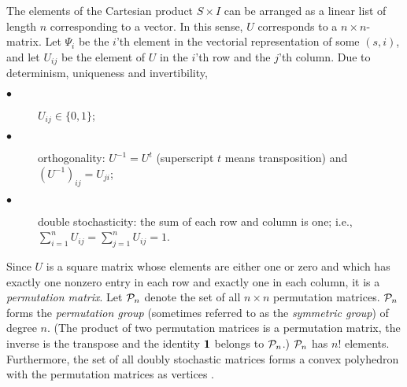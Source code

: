 \documentclass[pra,amsfonts,twocolumn]{revtex4}
\begin{document}
The elements of the Cartesian product
$S\times I$ can be arranged as a linear list of length
$n$ corresponding to  a vector. In this sense,
$U$ corresponds to a $n\times n$-matrix.  Let $\Psi_i$
be the $i$'th element in the vectorial representation of some
$(s,i)$, and let
$U_{ij}$ be the element
of
$U$ in the $i$'th row and the $j$'th column.
Due to
determinism, uniqueness and invertibility,
\begin{description}
\item[$\bullet$]
$U_{ij}\in \{0,1\}$;
\item[$\bullet$]
orthogonality:
 $U^{-1}=U^t$ (superscript $t$ means transposition) and
$(U^{-1})_{ij}=U_{ji}$;
\item[$\bullet$]
double stochasticity:
the sum of each row and column is one; i.e.,
$\sum_{i=1}^n U_{ij}= \sum_{j=1}^n U_{ij}=1$.
\end{description}
Since $U$ is a square matrix whose elements are either one or zero and
which has exactly one nonzero entry in each row and exactly one in each
column, it is a {\em permutation matrix}.
Let ${\cal P}_n$ denote the set of all $n\times n$ permutation matrices.
 ${\cal P}_n$ forms the {\em permutation group} (sometimes referred to
as the
{\em symmetric group}) of degree $n$. (The product of two permutation
matrices is
a permutation matrix, the inverse is the transpose and the identity
${\bf
1}$ belongs to  ${\cal P}_n$.)
${\cal P}_n$ has $n!$ elements.
Furthermore, the set of all doubly stochastic matrices forms a convex
polyhedron with the permutation matrices as vertices
\cite[page 82]{ber-ple}.
\end{document}
